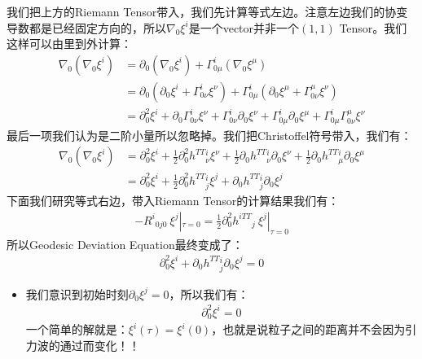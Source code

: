 \bigskip
{}

我们把上方的Riemann Tensor带入，我们先计算等式左边。注意左边我们的协变导数都是已经固定方向的，所以$ \nabla_0
\xi^i $是一个vector并非一个$ (1,1) $ Tensor。我们这样可以由里到外计算：
\begin{align}
  \nabla_{0}(\nabla_{0}\xi^{i}) &= \partial_{0}(\nabla_{0}\xi^{i}) +
  \Gamma_{0\mu}^{i}(\nabla_{0}\xi^{\mu}) \\
  &= \partial_{0}\left(\partial_{0}\xi^{i} +
  \Gamma_{0\nu}^{i}\xi^{\nu}\right) +
  \Gamma_{0\mu}^{i}\left(\partial_{0}\xi^{\mu} +
  \Gamma_{0\nu}^{\mu}\xi^{\nu}\right) \\
  &= \partial_{0}^{2}\xi^{i} + \partial_{0}\Gamma_{0\nu}^{i}\xi^{\nu}
  + \Gamma_{0\nu}^{i}\partial_{0}\xi^{\nu} +
  \Gamma_{0\mu}^{i}\partial_{0}\xi^{\mu} +
  \Gamma_{0\mu}^{i}\Gamma_{0\nu}^{\mu}\xi^{\nu}
\end{align}
最后一项我们认为是二阶小量所以忽略掉。我们把Christoffel符号带入，我们有：
\begin{align}
  \nabla_{0}(\nabla_{0}\xi^{i}) &= \partial_{0}^{2}\xi^{i} +
  \frac{1}{2}\partial_{0}^{2}h^{TT}{}^{i}_\nu \xi^{\nu} +
  \frac{1}{2}\partial_{0}h^{TT}{}^{i}_\nu \partial_{0}\xi^{\nu} +
  \frac{1}{2}\partial_{0}h^{TT}{}^{i}_\mu \partial_{0}\xi^{\mu} \\
  &= \partial_{0}^{2}\xi^{i} +
  \frac{1}{2}\partial_{0}^{2}h^{TT}{}^{i}_j \xi^{j} +
  \partial_{0}h^{TT}{}^{i}_j \partial_{0}\xi^{j}
\end{align}
下面我们研究等式右边，带入Riemann Tensor的计算结果我们有：
\begin{align}
  -R^{i}{}_{0j0} \ \xi^{j}|_{\tau=0} =
  \frac{1}{2}\partial_{0}^{2}h^{iTT}{}_{j} \ \xi^{j}|_{\tau=0}
\end{align}
所以Geodesic Deviation Equation最终变成了：
\begin{align}
  \partial_{0}^{2}\xi^{i} + \partial_{0}h^{TT}{}^{i}_j \partial_{0}\xi^{j} = 0
\end{align}
\begin{itemize}
  \item 我们意识到初始时刻$ \partial_{0}\xi^{j} = 0 $，所以我们有：
    \begin{align}
      \partial_{0}^{2}\xi^{i} = 0
    \end{align}
    一个简单的解就是：$  \xi^{i}(\tau) = \xi^{i}(0) $，也就是说粒子之间的距离并不会因为引力波的通过而变化！！
\end{itemize}

